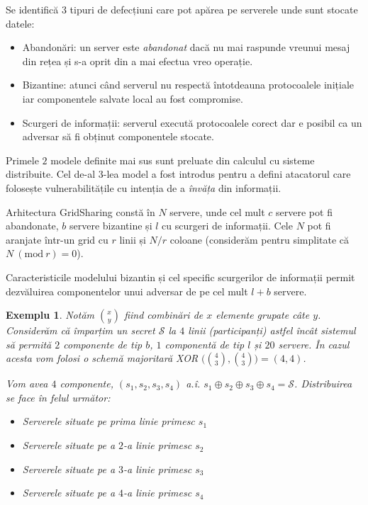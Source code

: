 \documentclass[oneside, 12pt]{book}
\newcommand{\Mod}[1]{\ (\text{mod}\ #1)}
\newtheorem{exemplu}{\textbf{Exemplu}}[section]
\begin{document}
Se identifică 3 tipuri de defecțiuni care pot apărea pe serverele unde sunt stocate datele:
\begin{itemize}
	\item Abandonări: un server este \textit{abandonat} dacă nu mai raspunde vreunui mesaj din rețea și s-a oprit din a mai efectua vreo operație.
	\item Bizantine: atunci când serverul nu respectă întotdeauna protocoalele inițiale iar componentele salvate local au fost compromise.
	\item Scurgeri de informații: serverul execută protocoalele corect dar e posibil ca un adversar să fi obținut componentele stocate.
\end{itemize}
Primele $2$ modele definite mai sus sunt preluate din calculul cu sisteme distribuite. Cel de-al $3$-lea model a fost introdus pentru a defini atacatorul care folosește vulnerabilitățile cu intenția de a \textit{învăța} din informații.

Arhitectura GridSharing constă în $N$ servere, unde cel mult $c$ servere pot fi abandonate, $b$ servere bizantine și $l$ cu scurgeri de informații. Cele $N$ pot fi aranjate într-un grid cu $r$ linii și $N/r$ coloane (considerăm pentru simplitate că $N \Mod r = 0$).

Caracteristicile modelului bizantin și cel specific scurgerilor de informații permit dezvăluirea componentelor unui adversar de pe cel mult $l + b$ servere.

\begin{exemplu}

	Notăm ${x \choose y}$ fiind combinări de $x$ elemente grupate câte $y$.
	Considerăm că împarțim un secret $\mathcal{S}$ la $4$ linii (participanți) astfel încât sistemul să permită $2$ componente de tip $b$, $1$ componentă de tip $l$ și $20$ servere. În cazul acesta vom folosi o schemă majoritară XOR $\big( {4 \choose 3}, {4 \choose 3}\big) = (4,4)$.

	Vom avea $4$ componente, $(s_1, s_2, s_3, s_4)$ a.î. $s_1 \oplus s_2 \oplus s_3 \oplus s_4 = \mathcal{S}$.
	Distribuirea se face în felul următor:
	\begin{itemize}
		\item Serverele situate pe prima linie primesc $s_1$
		\item Serverele situate pe a $2$-a linie primesc $s_2$
		\item Serverele situate pe a $3$-a linie primesc $s_3$
		\item Serverele situate pe a $4$-a linie primesc $s_4$
	\end{itemize}
\end{exemplu}
\end{document}
